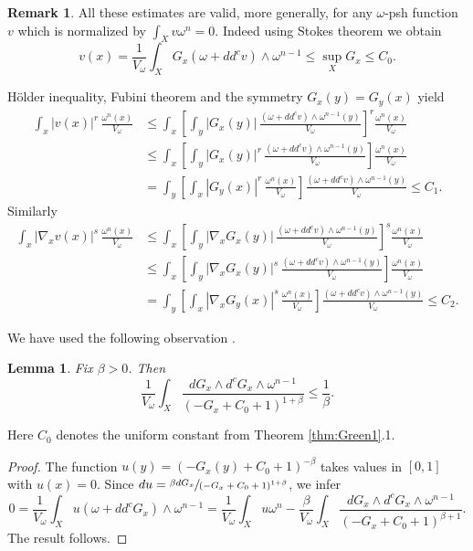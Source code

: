 \documentclass[JEP,XML,SOM,Unicode,published]{cedram}
\newtheorem{lem}[theorem]{Lemma}
\theoremstyle{definition}
\newtheorem{rem}[theorem]{Remark}
\begin{document}
\begin{rem}
All these estimates are valid, more generally, for any $\omega$-psh function~$v$ which is
normalized by $\int_X v \omega^n=0$. Indeed using Stokes theorem we obtain
\[
v(x) =\frac{1}{V_{\omega}} \int_X G_x (\omega+dd^c v) \wedge \omega^{n-1} \leq \sup_X G_x \leq C_0.
\]

Hölder inequality, Fubini theorem and the symmetry $G_x(y)=G_y(x)$ yield
\begin{align*}
\int_x |v(x)|^r \,\frac{\omega^n(x)}{V_{\omega}}
&\leq  \int_x \left[ \int_y |G_x(y)|\, \frac{(\omega+dd^c v) \wedge \omega^{n-1}(y)}{V_{\omega}} \right]^r \frac{\omega^n(x)}{V_{\omega}} \\
&\leq  \int_x \left[ \int_y |G_x(y)|^r\, \frac{(\omega+dd^c v) \wedge \omega^{n-1}(y)}{V_{\omega}} \right] \frac{\omega^n(x)}{V_{\omega}} \\
&= \int_y \left[ \int_x |G_y(x)|^r\, \frac{\omega^n(x)}{V_{\omega}} \right] \frac{(\omega+dd^c v) \wedge \omega^{n-1}(y)}{V_{\omega}} \leq C_1.
\end{align*}
Similarly
\begin{align*}
\int_x |\nabla_x v(x)|^s \,\frac{\omega^n(x)}{V_{\omega}}
&\leq  \int_x \left[ \int_y | \nabla_x G_x(y)|\, \frac{(\omega+dd^c v) \wedge \omega^{n-1}(y)}{V_{\omega}} \right]^s \frac{\omega^n(x)}{V_{\omega}} \\
&\leq  \int_x \left[ \int_y |\nabla_x G_x(y)|^s\, \frac{(\omega+dd^c v) \wedge \omega^{n-1}(y)}{V_{\omega}} \right] \frac{\omega^n(x)}{V_{\omega}} \\
&= \int_y \left[ \int_x |\nabla_x G_y(x)|^s\, \frac{\omega^n(x)}{V_{\omega}} \right] \frac{(\omega+dd^c v) \wedge \omega^{n-1}(y)}{V_{\omega}} \leq C_2.
\end{align*}
\end{rem}

We have used the following observation \cite[Lem.\,5.6]{GPSS22}.

\begin{lem} \label{lem:weightedgradient}
Fix $\beta>0$. Then
\[
\frac{1}{V_{\omega}} \int_X \frac{d G_x \wedge d^c G_x \wedge \omega^{n-1}}{(-G_x+C_0+1)^{1+\beta}} \leq \frac{1}{\beta}.
\]
\end{lem}

Here $C_0$ denotes the uniform constant from Theorem \ref{thm:Green1}.1.

\begin{proof}
The function $u(y)=(-G_x(y)+C_0+1)^{-\beta}$ takes values in $[0,1]$ with $u(x)=0$.
Since $du=\sfrac{\beta dG_x}{(-G_x+C_0+1)^{1+\beta}}$, we infer
\[
0=\frac{1}{V_{\omega}} \int_X u (\omega+dd^c G_x) \wedge \omega^{n-1}
=\frac{1}{V_{\omega}} \int_X u \omega^{n}
- \frac{\beta}{V_{\omega}} \int_X \frac{d G_x \wedge d^c G_x \wedge \omega^{n-1}}{(-G_x+C_0+1)^{\beta+1}}.
\]
The result follows.
\end{proof}
\end{document}
